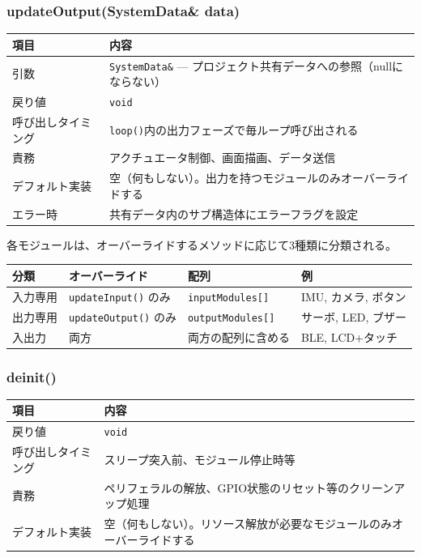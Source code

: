 \subsubsection{updateOutput(SystemData\& data)}

\begin{tabularx}{\textwidth}{l X}
\toprule
\textbf{項目} & \textbf{内容} \\
\midrule
引数 & \texttt{SystemData\&} — プロジェクト共有データへの参照（nullにならない） \\
戻り値 & \texttt{void} \\
呼び出しタイミング & \texttt{loop()}内の出力フェーズで毎ループ呼び出される \\
責務 & アクチュエータ制御、画面描画、データ送信 \\
デフォルト実装 & 空（何もしない）。出力を持つモジュールのみオーバーライドする \\
エラー時 & 共有データ内のサブ構造体にエラーフラグを設定 \\
\bottomrule
\end{tabularx}

\begin{notebox}[モジュールの入出力分類]
各モジュールは、オーバーライドするメソッドに応じて3種類に分類される。

\begin{tabularx}{\textwidth}{l l l X}
\toprule
\textbf{分類} & \textbf{オーバーライド} & \textbf{配列} & \textbf{例} \\
\midrule
入力専用 & \texttt{updateInput()} のみ & \texttt{inputModules[]} & IMU, カメラ, ボタン \\
出力専用 & \texttt{updateOutput()} のみ & \texttt{outputModules[]} & サーボ, LED, ブザー \\
入出力 & 両方 & 両方の配列に含める & BLE, LCD+タッチ \\
\bottomrule
\end{tabularx}
\end{notebox}

\subsubsection{deinit()}

\begin{tabularx}{\textwidth}{l X}
\toprule
\textbf{項目} & \textbf{内容} \\
\midrule
戻り値 & \texttt{void} \\
呼び出しタイミング & スリープ突入前、モジュール停止時等 \\
責務 & ペリフェラルの解放、GPIO状態のリセット等のクリーンアップ処理 \\
デフォルト実装 & 空（何もしない）。リソース解放が必要なモジュールのみオーバーライドする \\
\bottomrule
\end{tabularx}

